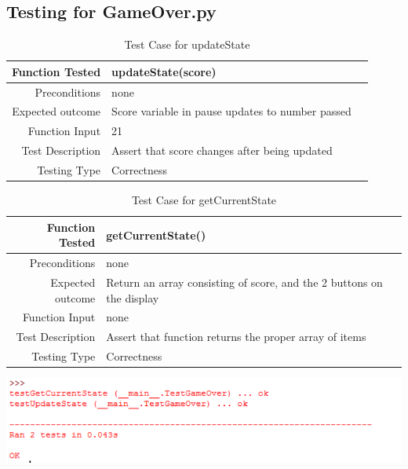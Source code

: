 \documentclass[12pt]{article}
\begin{document}
\subsection{Testing for GameOver.py}
\begin{center}
	\begin{longtable}{ | r | p{4cm} | p{4cm} }
	\caption{Test Case for updateState} \\ \hline \label{TblInputVar} 
	Function Tested & updateState(score)\\ \hline
	Preconditions & none \\ \hline
	Expected outcome & Score variable in pause updates to number passed  \\ \hline
	Function Input & 21 \\ \hline
	Test Description & Assert that score changes after being updated\\ \hline
	Testing Type & Correctness\\ \hline
	
	\end{longtable}

\end{center}

\begin{center}
	\begin{longtable}{ | r | p{4cm} | p{4cm} }
	\caption{Test Case for getCurrentState} \\ \hline \label{TblInputVar} 
	Function Tested & getCurrentState()\\ \hline
	Preconditions & none \\ \hline
	Expected outcome & Return an array consisting of score, and the 2 buttons on the display  \\ \hline
	Function Input & none \\ \hline
	Test Description & Assert that function returns the proper array of items \\ \hline
	Testing Type & Correctness\\ \hline
	
	\end{longtable}
\includegraphics{testGameOverResults}\newline\newline
\end{center}
\end{document}
